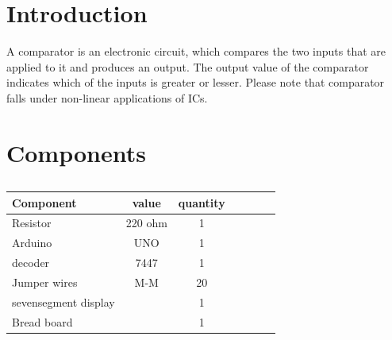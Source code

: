 \documentclass[10pt, a4paper]{article}
\title{\mytitle}
\author{\myauthor\hspace{1em}\\\contact\\IITH\hspace{0.5em}-\hspace{0.5em}\mymodule}
\date{}
\begin{document}
	\maketitle
	\tableofcontents
	\begin{abstract}
Design a sequential circuit that take(A3 A2 A1 A0 ) and (B3 B2 B1 B0) compares both A and B.The out put should be 1(A<B),2(A>B),3(A=B) on seven seg display.
	\end{abstract}
    \section{Introduction}
    A comparator is an electronic circuit, which compares the two inputs that are applied to it and produces an output. The output value of the comparator indicates which of the inputs is greater or lesser. Please note that comparator falls under non-linear applications of ICs.
	\section{Components}
	
\begin{table}[htbp]
 \begin{center}
    \begin{tabular}{|l|c|c|c|c|c|c} \hline \textbf{Component}
  & \textbf{value} & \textbf{quantity} \\
 \hline
Resistor & 220 ohm & 1 \\ \hline
Arduino & UNO & 1 \\ \hline
decoder & 7447 & 1  \\ \hline
Jumper wires & M-M & 20\\ \hline
sevensegment display &  & 1 \\ \hline
Bread board &  & 1 \\ \hline
\end{tabular}   
\end{center}
\caption{\label{table:table} }
\end{table}
\end{document}
